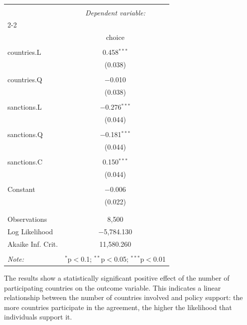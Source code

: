 \documentclass[12pt,letterpaper]{article}
\begin{document}
\begin{enumerate}
\begin{table}[!htbp] \centering 
	\caption{} 
	\label{} 
	\begin{tabular}{@{\extracolsep{5pt}}lc} 
		\\[-1.8ex]\hline 
		\hline \\[-1.8ex] 
		& \multicolumn{1}{c}{\textit{Dependent variable:}} \\ 
		\cline{2-2} 
		\\[-1.8ex] & choice \\ 
		\hline \\[-1.8ex] 
		countries.L & 0.458$^{***}$ \\ 
		& (0.038) \\ 
		& \\ 
		countries.Q & $-$0.010 \\ 
		& (0.038) \\ 
		& \\ 
		sanctions.L & $-$0.276$^{***}$ \\ 
		& (0.044) \\ 
		& \\ 
		sanctions.Q & $-$0.181$^{***}$ \\ 
		& (0.044) \\ 
		& \\ 
		sanctions.C & 0.150$^{***}$ \\ 
		& (0.044) \\ 
		& \\ 
		Constant & $-$0.006 \\ 
		& (0.022) \\ 
		& \\ 
		\hline \\[-1.8ex] 
		Observations & 8,500 \\ 
		Log Likelihood & $-$5,784.130 \\ 
		Akaike Inf. Crit. & 11,580.260 \\ 
		\hline 
		\hline \\[-1.8ex] 
		\textit{Note:}  & \multicolumn{1}{r}{$^{*}$p$<$0.1; $^{**}$p$<$0.05; $^{***}$p$<$0.01} \\ 
	\end{tabular} 
\end{table} 

The results show a statistically significant positive effect of the number of participating countries on the outcome variable. This indicates a linear relationship between the number of countries involved and policy support: the more countries participate in the agreement, the higher the likelihood that individuals support it.\


\end{enumerate}
\end{document}
